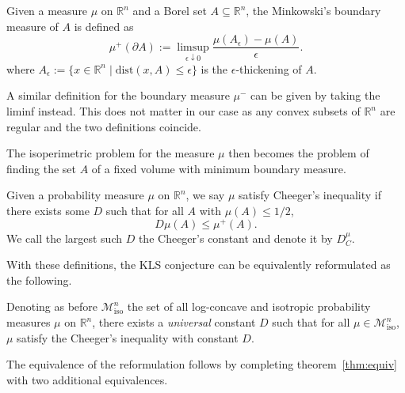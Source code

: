 \begin{definition}
  Given a measure \(\mu\) on \(\mathbb{R}^n\) and a Borel set \(A \subseteq \mathbb{R}^n\), the Minkowski's 
  boundary measure of \(A\) is defined as
  \[\mu^+(\partial A) := \limsup_{\epsilon \downarrow 0} \frac{\mu(A_\epsilon) - \mu(A)}{\epsilon}.\]
  where \(A_\epsilon := \{x \in \mathbb{R}^n \mid \text{dist}(x, A) \le \epsilon\}\) is the 
  \(\epsilon\)-thickening of \(A\). 

  A similar definition for the boundary measure \(\mu^-\) can be given by taking the liminf instead. This 
  does not matter in our case as any convex subsets of \(\mathbb{R}^n\) are regular and the two definitions 
  coincide. 
\end{definition}

The isoperimetric problem for the measure \(\mu\) then becomes the problem of finding the set \(A\) 
of a fixed volume with minimum boundary measure. 

\begin{definition}
  Given a probability measure \(\mu\) on \(\mathbb{R}^n\), we say \(\mu\) satisfy Cheeger's inequality 
  if there exists some \(D\) such that for all \(A\) with \(\mu(A) \le 1 / 2\),
  \[D\mu(A) \le \mu^+(A).\]
  We call the largest such \(D\) the Cheeger's constant and denote it by \(D^\mu_C\).
\end{definition}

With these definitions, the KLS conjecture can be equivalently reformulated as the following.

\begin{conjecture}
  Denoting as before \(\mathscr{M}^n_{\text{iso}}\) the set of all log-concave and isotropic probability measures \(\mu\) on 
  \(\mathbb{R}^n\), there exists a \textit{universal} constant \(D\) such that for all 
  \(\mu \in \mathscr{M}^n_{\text{iso}}\), \(\mu\) satisfy the Cheeger's inequality with constant \(D\).
\end{conjecture}

The equivalence of the reformulation follows by completing theorem~\ref{thm:equiv} with two additional 
equivalences.

